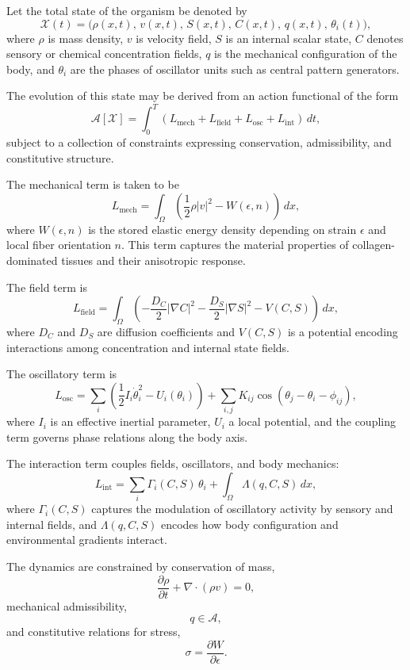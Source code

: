 \documentclass[11pt,oneside]{book}
\begin{document}
Let the total state of the organism be denoted by
\[
\mathcal{X}(t)
=
\big(
\rho(x,t),\, v(x,t),\, S(x,t),\, C(x,t),\, q(x,t),\, \theta_i(t)
\big),
\]
where $\rho$ is mass density, $v$ is velocity field, $S$ is an internal scalar state, $C$ denotes sensory or chemical concentration fields, $q$ is the mechanical configuration of the body, and $\theta_i$ are the phases of oscillator units such as central pattern generators.

The evolution of this state may be derived from an action functional of the form
\[
\mathcal{A}[\mathcal{X}]
=
\int_0^T
\left(
L_{\mathrm{mech}}
+
L_{\mathrm{field}}
+
L_{\mathrm{osc}}
+
L_{\mathrm{int}}
\right)\,dt,
\]
subject to a collection of constraints expressing conservation, admissibility, and constitutive structure.

The mechanical term is taken to be
\[
L_{\mathrm{mech}}
=
\int_\Omega
\left(
\frac{1}{2}\rho |v|^2 - W(\epsilon, n) 
\right)\,dx,
\]
where $W(\epsilon,n)$ is the stored elastic energy density depending on strain $\epsilon$ and local fiber orientation $n$. This term captures the material properties of collagen-dominated tissues and their anisotropic response.

The field term is
\[
L_{\mathrm{field}}
=
\int_\Omega
\left(
-\frac{D_C}{2}|\nabla C|^2
-\frac{D_S}{2}|\nabla S|^2
- V(C,S)
\right)\,dx,
\]
where $D_C$ and $D_S$ are diffusion coefficients and $V(C,S)$ is a potential encoding interactions among concentration and internal state fields.

The oscillatory term is
\[
L_{\mathrm{osc}}
=
\sum_i
\left(
\frac{1}{2}I_i \dot{\theta}_i^2 - U_i(\theta_i)
\right)
+
\sum_{i,j}
K_{ij}\cos(\theta_j-\theta_i-\phi_{ij}),
\]
where $I_i$ is an effective inertial parameter, $U_i$ a local potential, and the coupling term governs phase relations along the body axis.

The interaction term couples fields, oscillators, and body mechanics:
\[
L_{\mathrm{int}}
=
\sum_i
\Gamma_i(C,S)\,\theta_i
+
\int_\Omega
\Lambda(q,C,S)\,dx,
\]
where $\Gamma_i(C,S)$ captures the modulation of oscillatory activity by sensory and internal fields, and $\Lambda(q,C,S)$ encodes how body configuration and environmental gradients interact.

The dynamics are constrained by conservation of mass,
\[
\frac{\partial \rho}{\partial t} + \nabla \cdot (\rho v)=0,
\]
mechanical admissibility,
\[
q \in \mathcal{A},
\]
and constitutive relations for stress,
\[
\sigma = \frac{\partial W}{\partial \epsilon}.
\]
\end{document}
